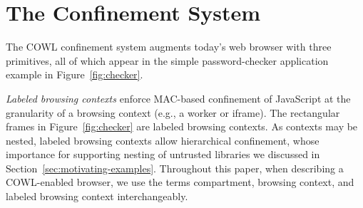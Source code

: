 \section{The \sys{} Confinement System}
\label{sec:system}

The COWL confinement system augments today's web browser with three
primitives, all of which appear in the simple password-checker
application example in Figure~\ref{fig:checker}.
%


%

{\em Labeled browsing contexts} enforce MAC-based confinement of
JavaScript at the granularity of a browsing context (e.g., a worker or
iframe). The rectangular frames in Figure~\ref{fig:checker} are
labeled browsing contexts. As contexts may be nested, labeled browsing
contexts allow hierarchical confinement, whose importance for
supporting nesting of untrusted libraries we discussed in
Section~\ref{sec:motivating-examples}. Throughout this paper, when
describing a COWL-enabled browser, we use the terms compartment,
browsing context, and labeled browsing context interchangeably.

